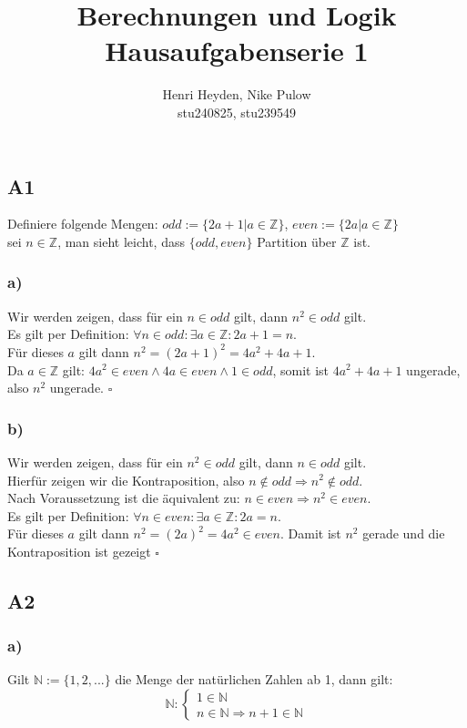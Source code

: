 \documentclass[12pt, a4paper]{article}
\title{Berechnungen und Logik\\Hausaufgabenserie 1}
\author{Henri Heyden, Nike Pulow \\ \small stu240825, stu239549}
\date{}
\newcommand*{\qed}{\null\nobreak\hfill\ensuremath{\square}}
\begin{document}
\maketitle

\doublespacing
\subsection*{A1}
Definiere folgende Mengen: \(odd := \{2a+1 | a \in \mathbb Z\}\), \(even := \{2a | a \in \mathbb Z\}\)\\
sei \(n \in \mathbb Z\), man sieht leicht, dass \(\{odd, even\}\) Partition über \(\mathbb Z\) ist.
\subsubsection*{a)}
Wir werden zeigen, dass für ein \(n\in odd\) gilt, dann \(n^2\in odd\) gilt. \\
Es gilt per Definition: \(\forall n \in odd: \exists a \in \mathbb Z: 2a+1 = n\). \\
Für dieses \(a\) gilt dann \(n^2 = (2a+1)^2 = 4a^2 + 4a + 1\). \\
Da \(a \in \mathbb Z\) gilt: \(4a^2 \in even \wedge 4a \in even \wedge 1 \in odd\), somit ist \(4a^2 + 4a + 1\) ungerade, also \(n^2\) ungerade. \qed
\subsubsection*{b)}
Wir werden zeigen, dass für ein \(n^2\in odd\) gilt, dann \(n\in odd\) gilt. \\
Hierfür zeigen wir die Kontraposition, also \(n \not\in odd \Longrightarrow n^2 \not\in odd\). \\
Nach Voraussetzung ist die äquivalent zu: \(n \in even \Longrightarrow n^2 \in even\). \\
Es gilt per Definition: \(\forall n \in even: \exists a \in \mathbb Z: 2a = n\). \\
Für dieses \(a\) gilt dann \(n^2 = (2a)^2 = 4a^2 \in even\). Damit ist \(n^2\) gerade und die Kontraposition ist gezeigt \qed
\subsection*{A2}
\subsubsection*{a)}
Gilt \(\mathbb N := \{1, 2, ...\}\) die Menge der natürlichen Zahlen ab 1, dann gilt: \[\mathbb N : \begin{cases}
    1 \in \mathbb{N} \\
    n \in \mathbb{N} \Rightarrow n+1 \in \mathbb{N}
\end{cases}\]
\end{document}
